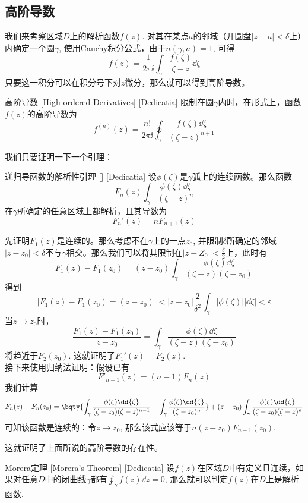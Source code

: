 \documentclass[UTF8]{ctexart}
\newcommand{\AnalyticalFunction}{\hyperref[dfn:AnalyticalFunction]{解析函数}}
\begin{document}
\subsection{高阶导数}
我们来考察区域$D$上的解析函数$f(z)$. 对其在某点$a$的邻域（开圆盘$|z-a|<\delta$上）内确定一个圆$\gamma$, 使用Cauchy积分公式，由于$n(\gamma,a)=1$, 可得
\[f(z)=\frac{1}{2\pi\ii}\int_\gamma\frac{f(\zeta)}{\zeta-z}\dd{\zeta}\]
只要这一积分可以在积分号下对$z$微分，那么就可以得到高阶导数。
\begin{dfn}
    [HighOrderedDerivative]
    {高阶导数}
    [High-ordered Derivatives]
    [Dedicatia]
    限制在圆$\gamma$内时，在形式上，函数$f(z)$的高阶导数为
    \[f^{(n)}(z)=\frac{n!}{2\pi\ii}\oint_\gamma\frac{f(\zeta)\dd{\zeta}}{(\zeta-z)^{n+1}}\]
\end{dfn}
我们只要证明一下一个引理：
\begin{lma}
    [UUID]
    {递归导函数的解析性引理}
    []
    [Dedicatia]
    设$\phi(\zeta)$是$\gamma$弧上的连续函数。那么函数
    \[F_n(z)\int_\gamma \frac{\phi(\zeta)\dd{\zeta}}{(\zeta-z)^n}\]
    在$\gamma$所确定的任意区域上都解析，且其导数为
    \[F_n'(z)=nF_{n+1}(z)\]
\end{lma}
\begin{prf}
    先证明$F_1(z)$是连续的。那么考虑不在$\gamma$上的一点$z_0$, 并限制$\delta$所确定的邻域$|z-z_0|<\delta$不与$\gamma$相交。那么我们可以将其限制在$|z-Z_0|<\frac{\delta}{2}$上，此时有
    \[F_1(z)-F_1(z_0)=(z-z_0)\int_\gamma\frac{\phi(\zeta)\dd{\zeta}}{(\zeta-z)(\zeta-z_0)}\]
    得到
    \[|F_1(z)-F_1(z_0)=(z-z_0)|<|z-z_0|\frac{2}{\delta^2}\int_\gamma|\phi(\zeta)||\dd{\zeta}|<\varepsilon\]
    当$z\to z_0$时，
    \[\frac{F_1(z)-F_1(z_0)}{z-z_0}=\int_\gamma\frac{\phi(\zeta)\dd{\zeta}}{(\zeta-z)(\zeta-z_0)}\]
    将趋近于$F_2(z_0)$. 这就证明了$F_1'(z)=F_2(z) $.\\
    接下来使用归纳法证明：假设已有
    \[F'_{n-1}(z)=(n-1)F_n(z)\]
    我们计算
    \[F_n(z)-F_n(z_0)=\bqty{\int_\gamma\frac{\phi(\zeta)\dd{\zeta}}{(\zeta-z_0)(\zeta-z)^{n-1}}-\int_\gamma\frac{\phi(\zeta)\dd{\zeta}}{(\zeta-z_0)^n}}+(z-z_0)\int_\gamma\frac{\phi(\zeta)\dd{\zeta}}{(\zeta-z_0)(\zeta-z)^{n}}\]
    可知该函数是连续的：令$z\to z_0$, 那么该式应该等于$n(z-z_0)F_{n+1}(z_0)$.
\end{prf}
这就证明了上面所说的高阶导数的存在性。
\begin{thm}
    [UUID]
    {Morera定理}
    [Morera's Theorem]
    [Dedicatia]
    设$f(z)$在区域$D$中有定义且连续，如果对任意$D$中的闭曲线$\gamma$都有$\oint_\gamma f(z)\dd{z}=0$, 那么就可以判定$f(z)$在$D$上是\AnalyticalFunction .
\end{thm}
\end{document}

